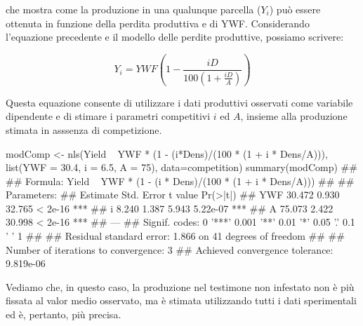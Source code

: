 \documentclass[a4paper,12pt,oneside]{book}
\newenvironment{Shaded}{}{}
\newcommand{\KeywordTok}[1]{#1}
\newcommand{\DataTypeTok}[1]{#1}
\newcommand{\DecValTok}[1]{#1}
\newcommand{\FloatTok}[1]{#1}
\newcommand{\StringTok}[1]{#1}
\newcommand{\CommentTok}[1]{#1}
\newcommand{\OperatorTok}[1]{#1}
\newcommand{\NormalTok}[1]{#1}
\begin{document}
che mostra come la produzione in una qualunque parcella (\(Y_i\)) può essere ottenuta in funzione della perdita produttiva e di YWF. Considerando l'equazione precedente e il modello delle perdite produttive, possiamo scrivere:

\[Y_i = YWF\left( {1 - \frac{iD}{100\left( {1 + \frac{iD}{A}} \right)}} \right)\]

Questa equazione consente di utilizzare i dati produttivi osservati come variabile dipendente e di stimare i parametri competitivi \(i\) ed \(A\), insieme alla produzione stimata in asssenza di competizione.

\begin{Shaded}
\begin{Highlighting}[]
\NormalTok{modComp <-}\StringTok{ }\KeywordTok{nls}\NormalTok{(Yield }\OperatorTok{~}\StringTok{ }\NormalTok{YWF }\OperatorTok{*}\StringTok{ }\NormalTok{(}\DecValTok{1} \OperatorTok{-}\StringTok{ }\NormalTok{(i}\OperatorTok{*}\NormalTok{Dens)}\OperatorTok{/}\NormalTok{(}\DecValTok{100} \OperatorTok{*}\StringTok{ }\NormalTok{(}\DecValTok{1} \OperatorTok{+}\StringTok{ }\NormalTok{i }\OperatorTok{*}\StringTok{ }\NormalTok{Dens}\OperatorTok{/}\NormalTok{A))),}
               \KeywordTok{list}\NormalTok{(}\DataTypeTok{YWF =} \FloatTok{30.4}\NormalTok{, }\DataTypeTok{i =} \FloatTok{6.5}\NormalTok{, }\DataTypeTok{A =} \DecValTok{75}\NormalTok{),}
               \DataTypeTok{data=}\NormalTok{competition)}
\KeywordTok{summary}\NormalTok{(modComp)}
\CommentTok{## }
\CommentTok{## Formula: Yield ~ YWF * (1 - (i * Dens)/(100 * (1 + i * Dens/A)))}
\CommentTok{## }
\CommentTok{## Parameters:}
\CommentTok{##     Estimate Std. Error t value Pr(>|t|)    }
\CommentTok{## YWF   30.472      0.930  32.765  < 2e-16 ***}
\CommentTok{## i      8.240      1.387   5.943 5.22e-07 ***}
\CommentTok{## A     75.073      2.422  30.998  < 2e-16 ***}
\CommentTok{## ---}
\CommentTok{## Signif. codes:  0 '***' 0.001 '**' 0.01 '*' 0.05 '.' 0.1 ' ' 1}
\CommentTok{## }
\CommentTok{## Residual standard error: 1.866 on 41 degrees of freedom}
\CommentTok{## }
\CommentTok{## Number of iterations to convergence: 3 }
\CommentTok{## Achieved convergence tolerance: 9.819e-06}
\end{Highlighting}
\end{Shaded}

Vediamo che, in questo caso, la produzione nel testimone non infestato non è più fissata al valor medio osservato, ma è stimata utilizzando tutti i dati sperimentali ed è, pertanto, più precisa.
\end{document}
